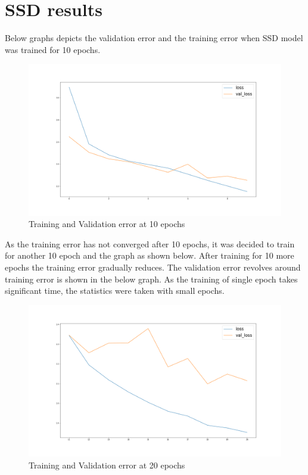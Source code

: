\section{SSD results}
Below graphs depicts the validation error and the training error when SSD model was trained for 10 epochs.
\begin{figure}[H]
\includegraphics[scale=0.3]{conf0_loss-val_loss_0_10epochs}
\begin{center}
\caption{Training and Validation error at 10 epochs}
\end{center}
\end{figure}
As the training error has not converged after 10 epochs, it was decided to train for another 10 epoch and the graph as shown below. After training for 10 more epochs the training error gradually reduces. The validation error revolves around training error is shown in the below graph. As the training of single epoch takes significant time, the statistics were taken with small epochs.

\begin{figure}[H]
\includegraphics[scale=0.3]{conf0_loss-val_loss_10_20epochs}
\begin{center}
\caption{Training and Validation error at 20 epochs}
\end{center}
\end{figure}

